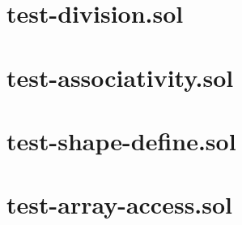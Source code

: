 \section{test-division.sol}


\section{test-associativity.sol}


\section{test-shape-define.sol}


\section{test-array-access.sol}


